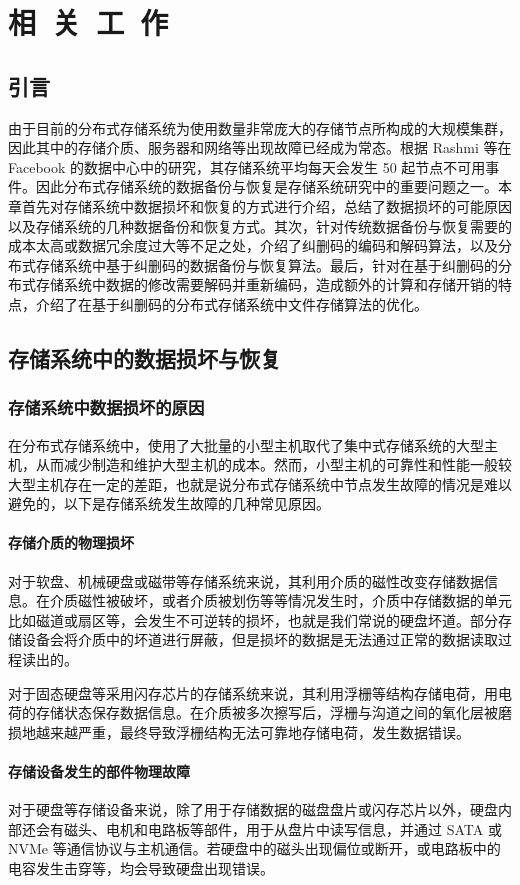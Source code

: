 \chapter[相关工作]{相\ 关\ 工\ 作}
\section{引言}
由于目前的分布式存储系统为使用数量非常庞大的存储节点所构成的大规模集群，因此其中的存储介质、服务器和网络等出现故障已经成为常态。根据 Rashmi 等在 Facebook 的数据中心中的研究\cite{rashmi2013solution}，其存储系统平均每天会发生 50 起节点不可用事件。因此分布式存储系统的数据备份与恢复是存储系统研究中的重要问题之一。本章首先对存储系统中数据损坏和恢复的方式进行介绍，总结了数据损坏的可能原因以及存储系统的几种数据备份和恢复方式。其次，针对传统数据备份与恢复需要的成本太高或数据冗余度过大等不足之处，介绍了纠删码的编码和解码算法，以及分布式存储系统中基于纠删码的数据备份与恢复算法。最后，针对在基于纠删码的分布式存储系统中数据的修改需要解码并重新编码，造成额外的计算和存储开销的特点，介绍了在基于纠删码的分布式存储系统中文件存储算法的优化。
\section{存储系统中的数据损坏与恢复}
\subsection{存储系统中数据损坏的原因}
在分布式存储系统中，使用了大批量的小型主机取代了集中式存储系统的大型主机，从而减少制造和维护大型主机的成本。然而，小型主机的可靠性和性能一般较大型主机存在一定的差距，也就是说分布式存储系统中节点发生故障的情况是难以避免的，以下是存储系统发生故障的几种常见原因。
\subsubsection{存储介质的物理损坏}
对于软盘、机械硬盘或磁带等存储系统来说，其利用介质的磁性改变存储数据信息。在介质磁性被破坏，或者介质被划伤等等情况发生时，介质中存储数据的单元比如磁道或扇区等，会发生不可逆转的损坏，也就是我们常说的硬盘坏道。部分存储设备会将介质中的坏道进行屏蔽，但是损坏的数据是无法通过正常的数据读取过程读出的。

对于固态硬盘等采用闪存芯片的存储系统来说，其利用浮栅等结构存储电荷，用电荷的存储状态保存数据信息。在介质被多次擦写后，浮栅与沟道之间的氧化层被磨损地越来越严重，最终导致浮栅结构无法可靠地存储电荷，发生数据错误。
\subsubsection{存储设备发生的部件物理故障}
对于硬盘等存储设备来说，除了用于存储数据的磁盘盘片或闪存芯片以外，硬盘内部还会有磁头、电机和电路板等部件，用于从盘片中读写信息，并通过 SATA 或 NVMe 等通信协议与主机通信。若硬盘中的磁头出现偏位或断开，或电路板中的电容发生击穿等，均会导致硬盘出现错误。
